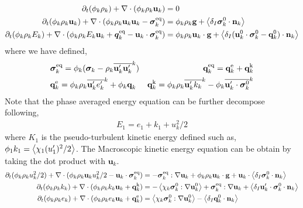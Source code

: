 \begin{align}
    \label{eq:dt_avg_rho}
    \partial_t (\phi_k \rho_k)  
    + \mathbf{\nabla}\cdot (
        \phi_k \rho_k\textbf{u}_k
    )
    &= 
    0\\
    \label{eq:dt_avg_rhou_k}
    \partial_t (\phi_k \rho_k\textbf{u}_k)  
    + \mathbf{\nabla}\cdot (
        \phi_k \rho_k\textbf{u}_k\textbf{u}_k
        - \bm{\sigma}_k^\text{eq}
    )
    &= 
    \phi_k \rho_k \textbf{g} 
    +  \left<\delta_I \bm{\sigma}_k^0 \cdot \textbf{n}_k\right>\\
    \label{eq:dt_avg_rhoE_k}
    \partial_t (\phi_k\rho_kE_k)  
    + \mathbf{\nabla}\cdot (
        \phi_k\rho_kE_k\textbf{u}_k
        + \bm{q}_k^\text{eq}
        - \textbf{u}_k \cdot \bm{\sigma}_k^\text{eq}
        )
    &= 
    \phi_k \rho_k\textbf{u}_k \cdot \textbf{g} 
    + \left<\delta_I (\textbf{u}_k^0 \cdot \bm{\sigma}_k^0 - \textbf{q}_k^0)\cdot \textbf{n}_k\right>
\end{align} 
where we have defined, 
\begin{align*}
    &\bm{\sigma}_k^\text{eq}
    = \phi_k (
        \bm{\sigma}_k%
        - \rho_k\kavg{\textbf{u}_k'\textbf{u}_k'})  
    &\textbf{q}_k^\text{eq}
    =\textbf{q}_k^\text{e} +\textbf{q}_k^\text{k}  \\
    &\textbf{q}_k^\text{e}
    = \phi_k\rho_k \kavg{\textbf{u}_k' e_k'} 
    + \phi_k\textbf{q}_k 
    &\textbf{q}_k^\text{k}
    = \phi_k\rho_k \kavg{\textbf{u}_k' k_k} 
    - \phi_k\kavg{\textbf{u}_k' \cdot \bm{\sigma}_k^0}
\end{align*}
Note that the phase averaged energy equation can be further decompose following, 
\begin{align*}
    E_1 = e_1 + k_1 + u_k^2/2
    \label{eq:E_def}
\end{align*}
where $K_1$ is the pseudo-turbulent kinetic energy defined such as, $\phi_1 k_1 = \left<\chi_1 (u_1')^2/2\right>$. 
The Macroscopic kinetic energy equation can be obtain by taking the dot product with $\textbf{u}_k$. 
\begin{align}
    \partial_t (\phi_k \rho_ku_k^2/2)  
    + \mathbf{\nabla}\cdot (
        \phi_k \rho_k\textbf{u}_ku_k^2/2
        - \textbf{u}_k \cdot \bm{\sigma}_k^\text{eq}
    )
    &= 
    - \bm{\sigma}_k^\text{eq} : \mathbf{\nabla} \textbf{u}_k
    + \phi_k \rho_k \textbf{u}_k\cdot \textbf{g} 
    +  \textbf{u}_k\cdot \left<\delta_I \bm{\sigma}_k^0 \cdot \textbf{n}_k\right>\\
    \partial_t (\phi_k\rho_kk_k)  
    + \mathbf{\nabla}\cdot (
        \phi_k\rho_kk_k\textbf{u}_k
        + \textbf{q}_k^\text{k} 
        )
    &= 
    - \left<\chi_k\bm{\sigma}_k^0 : \mathbf{\nabla} \textbf{u}_k^0\right>
    + \bm{\sigma}_k^\text{eq} : \mathbf{\nabla} \textbf{u}_k
    + \left<\delta_I \textbf{u}_k' \cdot \bm{\sigma}_k^0 \cdot \textbf{n}_k\right>\\
    \partial_t (\phi_k\rho_ke_k)  
    + \mathbf{\nabla}\cdot (
        \phi_k \rho_ke_k\textbf{u}_k
        +
        \textbf{q}_k^\text{e} 
        )
    &= 
    \left<\chi_k\bm{\sigma}_k^0 : \mathbf{\nabla} \textbf{u}_k^0\right>
    - \left<\delta_I \textbf{q}_k^0 \cdot \textbf{n}_k\right> 
\end{align}


